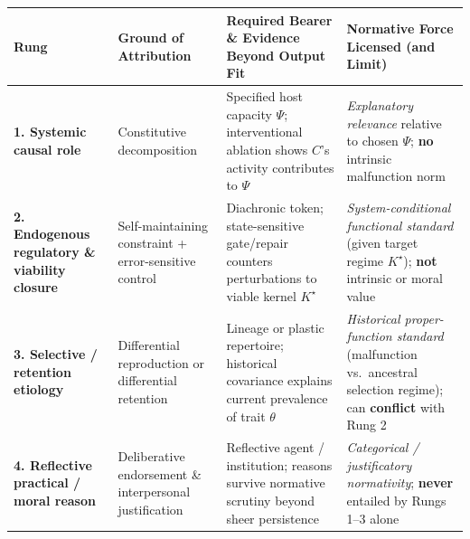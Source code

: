 \documentclass[11pt,a4paper]{article}
\newcounter{none}
\begin{document}
{\def\LTcaptype{none} %
\begin{longtable}[]{@{}
  >{\raggedright\arraybackslash}p{}
  >{\raggedright\arraybackslash}p{}
  >{\raggedright\arraybackslash}p{}
  >{\raggedright\arraybackslash}p{}@{}}
\toprule\noalign{}
\begin{minipage}[b]{\linewidth}\raggedright
Rung
\end{minipage} & \begin{minipage}[b]{\linewidth}\raggedright
Ground of Attribution
\end{minipage} & \begin{minipage}[b]{\linewidth}\raggedright
Required Bearer \& Evidence Beyond Output Fit
\end{minipage} & \begin{minipage}[b]{\linewidth}\raggedright
Normative Force Licensed (and Limit)
\end{minipage} \\
\midrule\noalign{}
\endhead
\bottomrule\noalign{}
\endlastfoot
\textbf{1. Systemic causal role} & Constitutive decomposition
\citep{cummins1975, craver2007} & Specified host capacity \(\Psi\);
interventional ablation shows \(C\)'s activity contributes to \(\Psi\) &
\emph{Explanatory relevance} relative to chosen \(\Psi\); \textbf{no}
intrinsic malfunction norm \citep{davies2001} \\
\textbf{2. Endogenous regulatory \& viability closure} &
Self-maintaining constraint + error-sensitive control
\citep{nagel1977, mossio2009, diPaolo2005, bich2024} & Diachronic token;
state-sensitive gate/repair counters perturbations to viable kernel
\(K^\star\) & \emph{System-conditional functional standard} (given
target regime \(K^\star\)); \textbf{not} intrinsic or moral value \\
\textbf{3. Selective / retention etiology} & Differential reproduction
or differential retention \citep{wright1973, millikan1984, garson2019} &
Lineage or plastic repertoire; historical covariance explains current
prevalence of trait \(\theta\) & \emph{Historical proper-function
standard} (malfunction vs.~ancestral selection regime); can
\textbf{conflict} with Rung 2 \\
\textbf{4. Reflective practical / moral reason} & Deliberative
endorsement \& interpersonal justification
\citep{korsgaard1996, scanlon1998, list2019} & Reflective agent /
institution; reasons survive normative scrutiny beyond sheer persistence
\citep{street2006} & \emph{Categorical / justificatory normativity};
\textbf{never} entailed by Rungs 1--3 alone \\
\end{longtable}
}
\end{document}
